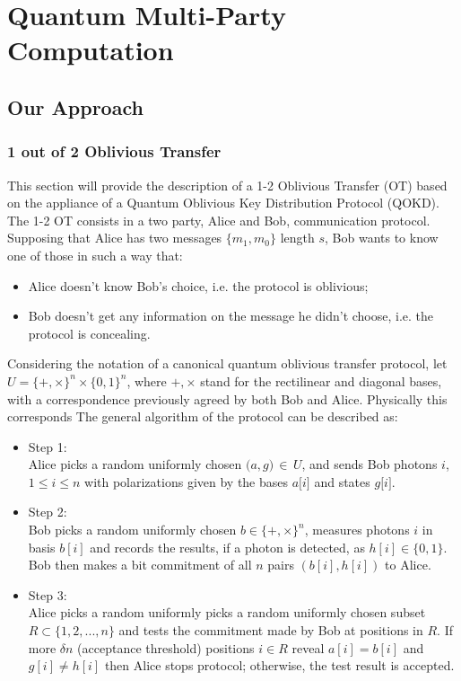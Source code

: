\section{Quantum Multi-Party Computation}
\begin{refsection}
	\subsection{Our Approach}
	\subsubsection{1 out of 2 Oblivious Transfer}
	This section will provide the description of a 1-2 Oblivious Transfer (OT) based on the appliance of a Quantum Oblivious Key Distribution Protocol (QOKD). The 1-2 OT consists in a two party, Alice and Bob, communication protocol. Supposing that Alice has two messages $\{m_1,m_0\}$ length $s$, Bob wants to know one of those in such a way that:
	\begin{itemize}
		\item Alice doesn't know Bob's choice, i.e. the protocol is oblivious;
		\item Bob doesn't get any information on the message he didn't choose, i.e. the protocol is concealing.
	\end{itemize}
	Considering the notation of a canonical quantum oblivious transfer protocol, let $U=\{+,\times\}^n\times\{0,1\}^n$, where $+, \times$ stand for the rectilinear and diagonal bases, with a correspondence previously agreed by both Bob and Alice. Physically this corresponds   The general algorithm of the protocol can be described as:
	\begin{itemize}
		\item Step 1:\\
		Alice picks a random uniformly chosen $\big(a,g\big)\,\in\,U$, and sends Bob photons $i$, $1\leq i \leq n$ with polarizations given by the bases $a\big[i\big]$ and states $g\big[i\big]$.
		\item Step 2:\\
		Bob picks a random uniformly chosen $b\in\{+,\times\}^n$, measures photons $i$ in basis $b\left[i\right]$ and records the results, if a photon is detected, as $h\left[i\right]\in\{0,1\}$. Bob then makes a bit commitment of all $n$ pairs $\left(b\left[i\right],h\left[i\right]\right)$ to Alice.
		\item Step 3:\\
		Alice picks a random uniformly picks a random uniformly chosen subset $R\subset\{1,2,...,n\}$ and tests the commitment made by Bob at positions in $R$. If more $\delta n$ (acceptance threshold) positions $i\in R$ reveal $a\left[i\right]=b\left[i\right]$ and $g\left[i\right]\neq h\left[i\right]$ then Alice stops protocol; otherwise, the test result is accepted.

\end{itemize}
\end{refsection}
